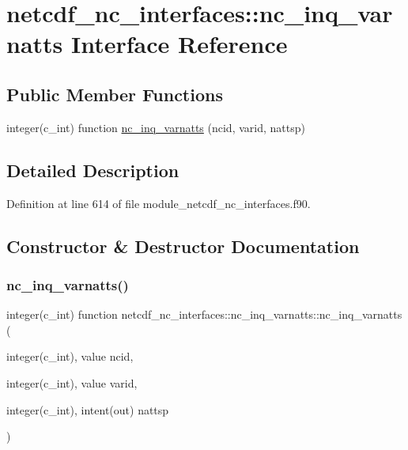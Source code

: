 \hypertarget{interfacenetcdf__nc__interfaces_1_1nc__inq__varnatts}{}\section{netcdf\+\_\+nc\+\_\+interfaces\+:\+:nc\+\_\+inq\+\_\+varnatts Interface Reference}
\label{interfacenetcdf__nc__interfaces_1_1nc__inq__varnatts}
\subsection*{Public Member Functions}
\begin{DoxyCompactItemize}
\item 
integer(c\+\_\+int) function \hyperlink{interfacenetcdf__nc__interfaces_1_1nc__inq__varnatts_a5b36820792ae946c498df96a9f0d9f8d}{nc\+\_\+inq\+\_\+varnatts} (ncid, varid, nattsp)
\end{DoxyCompactItemize}


\subsection{Detailed Description}


Definition at line 614 of file module\+\_\+netcdf\+\_\+nc\+\_\+interfaces.\+f90.



\subsection{Constructor \& Destructor Documentation}
\mbox{\label{interfacenetcdf__nc__interfaces_1_1nc__inq__varnatts_a5b36820792ae946c498df96a9f0d9f8d}} 
\subsubsection{\texorpdfstring{nc\+\_\+inq\+\_\+varnatts()}{nc\_inq\_varnatts()}}
{\footnotesize\ttfamily integer(c\+\_\+int) function netcdf\+\_\+nc\+\_\+interfaces\+::nc\+\_\+inq\+\_\+varnatts\+::nc\+\_\+inq\+\_\+varnatts (\begin{DoxyParamCaption}\item[{integer(c\+\_\+int), value}]{ncid,  }\item[{integer(c\+\_\+int), value}]{varid,  }\item[{integer(c\+\_\+int), intent(out)}]{nattsp }\end{DoxyParamCaption})}



